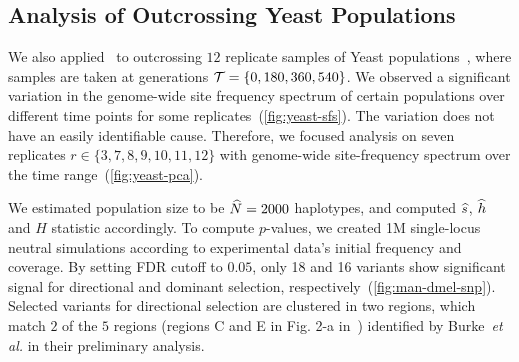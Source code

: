 
\subsection{Analysis of Outcrossing Yeast Populations}
We also applied \comale\ to outcrossing $12$ replicate samples of
Yeast populations~\cite{burke2014standing}, where samples are taken at
generations ${\cal T}=\{0,180,360,540\}$. We observed a significant
variation in the genome-wide site frequency spectrum of certain
populations over different time points for some
replicates~(\ref{fig:yeast-sfs}). The variation does not have an
easily identifiable cause. Therefore, we focused analysis on seven
replicates $r\in\{3,7,8,9,10,11,12\}$ with genome-wide site-frequency
spectrum over the time range~(\ref{fig:yeast-pca}).

We estimated population size to be $\widehat{N}=2000$ haplotypes, and computed
$\widehat{s}$, $\widehat{h}$ and $H$ statistic accordingly. To compute $p$-values, we
created 1M single-locus neutral simulations according to experimental
data's initial frequency and coverage. By setting FDR cutoff to
$0.05$, only 18 and 16 variants show significant signal for
directional and dominant selection,
respectively~(\ref{fig:man-dmel-snp}).  Selected variants for
directional selection are clustered in two regions, which match $2$ of
the $5$ regions (regions C and E in Fig. 2-a
in~\cite{burke2014standing}) identified by Burke~\emph{et al.} in
their preliminary analysis.  
